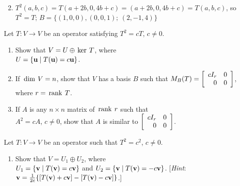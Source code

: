 \begin{multicols}{2}
\begin{ex}
\begin{enumerate}[label={\alph*.}]
\end{enumerate}
\begin{sol}
\begin{enumerate}[label={\alph*.}]
\setcounter{enumi}{1}
\item $T^{2}(a, b, c) = T(a + 2b, 0, 4b + c) = (a + 2b, 0, 4b + c) = T(a, b, c)$, so $T^{2} = T$; $B = \{(1, 0, 0), (0, 0, 1);\ (2, -1, 4)\}$

\end{enumerate}
\end{sol}
\end{ex}

\begin{ex}
Let $T : V \to V$ be an operator satisfying $T^{2} = cT$, $c \neq 0$.


\begin{enumerate}[label={\alph*.}]
\item Show that $V = U \oplus \thinspace\operatorname{ker \medspace}T$, where \\$U = \{\textbf{u} \mid T(\textbf{u}) = c\textbf{u}\}$. 

\item If $\thinspace\operatorname{dim \medspace}V = n$, show that $V$ has a basis $B$ such that $M_B(T) = \left[ \begin{array}{rr} cI_r & 0 \\ 0 & 0 \end{array} \right]$, where $r = \thinspace\operatorname{rank \medspace}T$.

\item If $A$ is any $n \times n$ matrix of $\thinspace\operatorname{rank \medspace}r$ such that\\ $A^{2} = cA$, $c \neq 0$, show that $A$ is similar to $\left[ \begin{array}{rr} cI_r & 0 \\ 0 & 0 \end{array} \right]$.

\end{enumerate}
\end{ex}

\begin{ex}
Let $T : V \to V$ be an operator such that $T^{2} = c^{2}$, $c \neq 0$.


\begin{enumerate}[label={\alph*.}]
\item Show that $V = U_{1} \oplus U_{2}$, where\\ $U_{1} = \{\textbf{v} \mid T(\textbf{v}) = c\textbf{v}\}$ and $U_{2} = \{\textbf{v} \mid T(\textbf{v}) = -c\textbf{v}\}$. [\textit{Hint}: $\textbf{v} = \tfrac{1}{2c} \{[T(\textbf{v}) + c\textbf{v}] - [T(\textbf{v}) - c\textbf{v}]\}$.]


\end{enumerate}
\end{ex}
\end{multicols}
